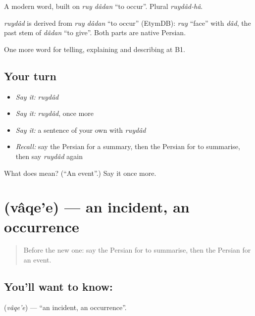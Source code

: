 A modern word, built on \emph{ruy dâdan} \textquotedblleft{}to occur\textquotedblright{}. Plural \emph{ruydâd-hâ}.

\begin{cousinweb}
\emph{ruydâd} is derived from \emph{ruy dâdan} \textquotedblleft{}to occur\textquotedblright{} (EtymDB): \emph{ruy} \textquotedblleft{}face\textquotedblright{} with \emph{dâd}, the past stem of \emph{dâdan} \textquotedblleft{}to give\textquotedblright{}. Both parts are native Persian.
\end{cousinweb}

\begin{grammarlens}[title={What you've built}]
One more word for telling, explaining and describing at B1.
\end{grammarlens}

\subsection*{Your turn}
\begin{itemize}
\raggedright
  \item \emph{Say it:} \emph{ruydâd}
  \item \emph{Say it:} \emph{ruydâd}, once more
  \item \emph{Say it:} a sentence of your own with \emph{ruydâd}
  \item \emph{Recall:} say the Persian for a summary, then the Persian for to summarise, then say \emph{ruydâd} again
\end{itemize}

\begin{tcolorbox}[breakable,colback=teal!4,colframe=teal!35!black,title={Before you move on}]
What does  mean? (\textquotedblleft{}An event\textquotedblright{}.) Say it once more.
\end{tcolorbox}
\section[\texorpdfstring{\fa{واقعه} (vâqe'e)}{واقعه (vâqe'e)}]{ (vâqe'e) — an incident, an occurrence}

\label{lesson:FA-C314-vaqee}



\begin{quote}
Before the new one: say the Persian for to summarise, then the Persian for an event.
\end{quote}

\subsection*{You'll want to know: }
\textbf{} (\emph{vâqe'e}) — \textquotedblleft{}an incident, an occurrence\textquotedblright{}.

